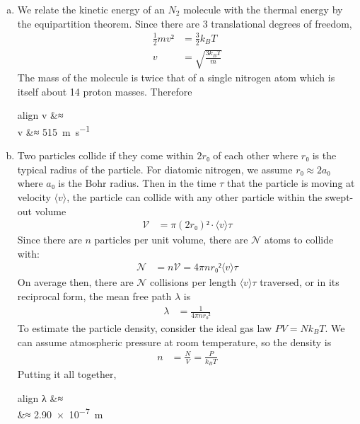 \begin{enumerate}[(a)]
	\item
		We relate the kinetic energy of an $N_2$ molecule with the thermal
		energy by the equipartition theorem. Since there are 3 translational
		degrees of freedom,
		\begin{align*}
			\frac 12 mv² &= \frac 32 k_B T \\
			v &= \sqrt{\frac{3 k_B T}{m}}
		\end{align*}
		The mass of the molecule is twice that of a single nitrogen atom
		which is itself about 14 proton masses. Therefore
		\begin{empheq}[box=\fbox]{align}
			v &≈  \\
			v &≈ \SI{515}{\m\per\s}
		\end{empheq}
	\item
		Two particles collide if they come within $2r₀$ of each other where
		$r₀$ is the typical radius of the particle. For diatomic nitrogen,
		we assume $r₀ ≈ 2a₀$ where $a₀$ is the Bohr radius. Then in the time
		$τ$ that the particle is moving at velocity $⟨v⟩$, the particle can
		collide with any other particle within the swept-out volume
		\begin{align*}
			\mathcal V &= π(2r₀)² ⋅ ⟨v⟩τ
		\end{align*}
		Since there are $n$ particles per unit volume, there are $\mathcal N$
		atoms to collide with:
		\begin{align*}
			\mathcal N &= n\mathcal V = 4πn{r₀}² ⟨v⟩τ
		\end{align*}
		On average then, there are $\mathcal N$ collisions per length $⟨v⟩τ$
		traversed, or in its reciprocal form, the mean free path $λ$ is
		\begin{align*}
			λ &= \frac{1}{4πn{r₀}²}
		\end{align*}
		To estimate the particle density, consider the ideal gas law
		$PV=Nk_BT$. We can assume atmospheric pressure at room temperature,
		so the density is
		\begin{align*}
			n &= \frac N V = \frac{P}{k_B T}
		\end{align*}
		Putting it all together,
		\begin{empheq}[box=\fbox]{align}
			λ &≈  \\
			{}&≈ \SI{2.90e-7}{\m}
		\end{empheq}
\end{enumerate}
